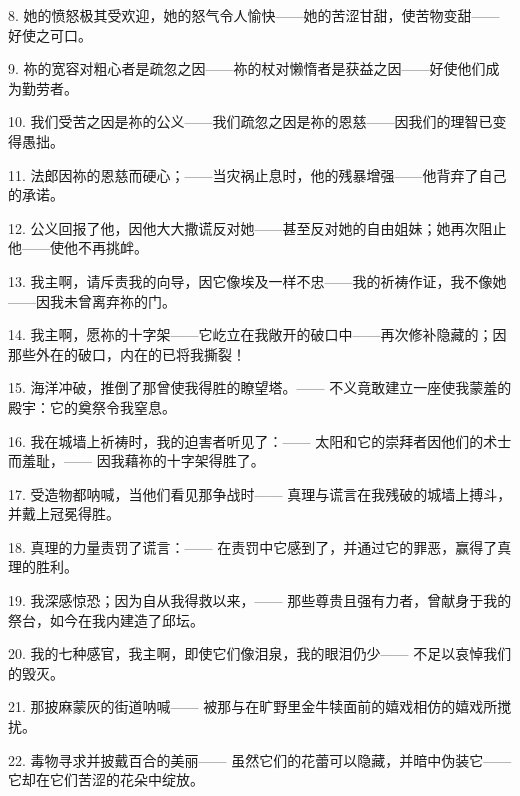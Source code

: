 8. 她的愤怒极其受欢迎，她的怒气令人愉快——她的苦涩甘甜，使苦物变甜——好使之可口。\par

9. 祢的宽容对粗心者是疏忽之因——祢的杖对懒惰者是获益之因——好使他们成为勤劳者。\par

10. 我们受苦之因是祢的公义——我们疏忽之因是祢的恩慈——因我们的理智已变得愚拙。\par

11. 法郎因祢的恩慈而硬心；——当灾祸止息时，他的残暴增强——他背弃了自己的承诺。\par

12. 公义回报了他，因他大大撒谎反对她——甚至反对她的自由姐妹；她再次阻止他——使他不再挑衅。\par

13. 我主啊，请斥责我的向导，因它像埃及一样不忠——我的祈祷作证，我不像她——因我未曾离弃祢的门。\par

14. 我主啊，愿祢的十字架——它屹立在我敞开的破口中——再次修补隐藏的；因那些外在的破口，内在的已将我撕裂！\par

15. 海洋冲破，推倒了那曾使我得胜的瞭望塔。—— 不义竟敢建立一座使我蒙羞的殿宇：它的奠祭令我窒息。\par

16. 我在城墙上祈祷时，我的迫害者听见了：—— 太阳和它的崇拜者因他们的术士而羞耻，—— 因我藉祢的十字架得胜了。\par

17. 受造物都呐喊，当他们看见那争战时—— 真理与谎言在我残破的城墙上搏斗，并戴上冠冕得胜。\par

18. 真理的力量责罚了谎言：—— 在责罚中它感到了，并通过它的罪恶，赢得了真理的胜利。\par

19. 我深感惊恐；因为自从我得救以来，—— 那些尊贵且强有力者，曾献身于我的祭台，如今在我内建造了邱坛。\par

20. 我的七种感官，我主啊，即使它们像泪泉，我的眼泪仍少—— 不足以哀悼我们的毁灭。\par

21. 那披麻蒙灰的街道呐喊—— 被那与在旷野里金牛犊面前的嬉戏相仿的嬉戏所搅扰。\par

22. 毒物寻求并披戴百合的美丽—— 虽然它们的花蕾可以隐藏，并暗中伪装它—— 它却在它们苦涩的花朵中绽放。\par

